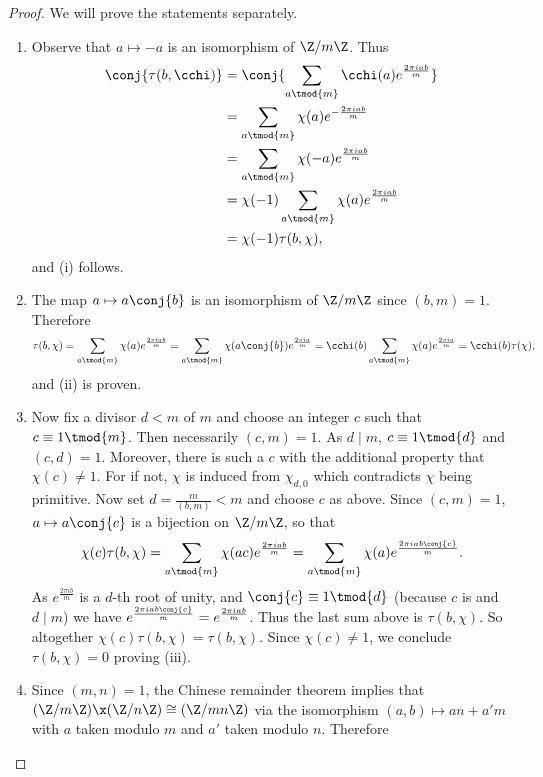       \begin{proof}
        We will prove the statements separately.
        \begin{enumerate}[label=(\roman*)]
          \item Observe that $a \mapsto -a$ is an isomorphism of $\Z/m\Z$. Thus
          \begin{align*}
            \conj{\tau(b,\cchi)} &= \conj{\sum_{a \tmod{m}}\cchi(a)e^{\frac{2\pi iab}{m}}} \\
            &= \sum_{a \tmod{m}}\chi(a)e^{-\frac{2\pi iab}{m}} \\
            &= \sum_{a \tmod{m}}\chi(-a)e^{\frac{2\pi iab}{m}} \\
            &= \chi(-1)\sum_{a \tmod{m}}\chi(a)e^{\frac{2\pi iab}{m}} \\
            &= \chi(-1)\tau(b,\chi),
          \end{align*}
          and (i) follows.
          \item The map $a \mapsto a\conj{b}$ is an isomorphism of $\Z/m\Z$ since $(b,m) = 1$. Therefore
          \[
            \tau(b,\chi) = \sum_{a \tmod{m}}\chi(a)e^{\frac{2\pi iab}{m}} = \sum_{a \tmod{m}}\chi(a\conj{b})e^{\frac{2\pi ia}{m}} = \cchi(b)\sum_{a \tmod{m}}\chi(a)e^{\frac{2\pi ia}{m}} = \cchi(b)\tau(\chi),
          \]
          and (ii) is proven.
          \item Now fix a divisor $d < m$ of $m$ and choose an integer $c$ such that $c \equiv 1 \tmod{m}$. Then necessarily $(c,m) = 1$. As $d \mid m$, $c \equiv 1 \tmod{d}$ and $(c,d) = 1$. Moreover, there is such a $c$ with the additional property that $\chi(c) \neq 1$. For if not, $\chi$ is induced from $\chi_{d,0}$ which contradicts $\chi$ being primitive. Now set $d = \frac{m}{(b,m)} < m$ and choose $c$ as above. Since $(c,m) = 1$, $a \mapsto a\conj{c}$ is a bijection on $\Z/m\Z$, so that
          \[
            \chi(c)\tau(b,\chi) = \sum_{a \tmod{m}}\chi(ac)e^{\frac{2\pi iab}{m}} = \sum_{a \tmod{m}}\chi(a)e^{\frac{2\pi iab\conj{c}}{m}}.
          \]
          As $e^{\frac{2\pi ib}{m}}$ is a $d$-th root of unity, and $\conj{c} \equiv 1 \tmod{d}$ (because $c$ is and $d \mid m$) we have $e^{\frac{2\pi iab\conj{c}}{m}} = e^{\frac{2\pi iab}{m}}$. Thus the last sum above is $\tau(b,\chi)$. So altogether $\chi(c)\tau(b,\chi) = \tau(b,\chi)$. Since $\chi(c) \neq 1$, we conclude $\tau(b,\chi) = 0$ proving (iii).
          \item Since $(m,n) = 1$, the Chinese remainder theorem implies that $(\Z/m\Z) \x (\Z/n\Z) \cong (\Z/mn\Z)$ via the isomorphism $(a,b) \mapsto an+a'm$ with $a$ taken modulo $m$ and $a'$ taken modulo $n$. Therefore

\end{enumerate}
\end{proof}
